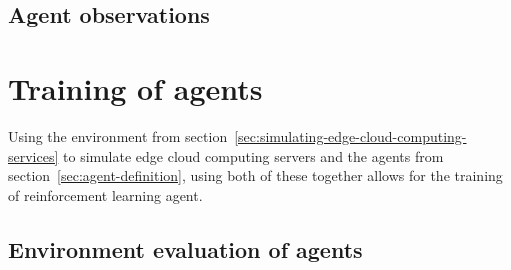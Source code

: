 \subsection{Agent observations}\label{subsec:agent-observations}


\section{Training of agents}\label{sec:training-of-agents}
Using the environment from section~\ref{sec:simulating-edge-cloud-computing-services} to simulate edge cloud computing
servers and the agents from section~\ref{sec:agent-definition}, using both of these together allows for the training
of reinforcement learning agent.


\subsection{Environment evaluation of agents}\label{subsec:environment-evaluation-of-agents}


